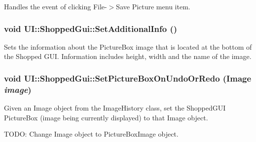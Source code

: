 \label{class_u_i_1_1_shopped_gui_a79d60e553769283f7b9ec8af7a9d3dc1}
Handles the event of clicking File-\/$>$Save Picture menu item. \hypertarget{class_u_i_1_1_shopped_gui_a292a827437d7f2098c13bc1a735a569e}{
\subsubsection[{SetAdditionalInfo}]{\setlength{\rightskip}{0pt plus 5cm}void UI::ShoppedGui::SetAdditionalInfo ()}}
\label{class_u_i_1_1_shopped_gui_a292a827437d7f2098c13bc1a735a569e}
Sets the information about the PictureBox image that is located at the bottom of the Shopped GUI. Information includes height, width and the name of the image. \hypertarget{class_u_i_1_1_shopped_gui_a9771176182b68022bc433aba6e42395f}{
\subsubsection[{SetPictureBoxOnUndoOrRedo}]{\setlength{\rightskip}{0pt plus 5cm}void UI::ShoppedGui::SetPictureBoxOnUndoOrRedo (Image {\em image})}}
\label{class_u_i_1_1_shopped_gui_a9771176182b68022bc433aba6e42395f}
Given an Image object from the ImageHistory class, set the ShoppedGUI PictureBox (image being currently displayed) to that Image object.

TODO: Change Image object to PictureBoxImage object.


